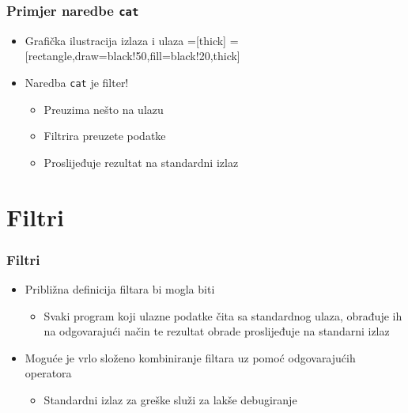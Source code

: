 \documentclass{beamer}
\newcommand{\shell}[1]{\texttt{#1}}
\begin{document}
\begin{frame}[t]
\frametitle{Primjer naredbe \shell{cat}}
\begin{itemize}
  \item Grafička ilustracija izlaza i ulaza
  \vspace{1cm}
  =[thick]
  =[rectangle,draw=black!50,fill=black!20,thick]
  \vspace{1cm}
  \item Naredba \shell{cat} je filter!
  \begin{itemize}
    \item Preuzima nešto na ulazu
    \item Filtrira preuzete podatke
    \item Proslijeđuje rezultat na standardni izlaz
  \end{itemize}
\end{itemize}
\end{frame}

\section{Filtri}
\begin{frame}[t]
\frametitle{Filtri}
\begin{itemize}
  \item Približna definicija filtara bi mogla biti
  \begin{itemize}
    \footnotesize
    \item[] Svaki program koji ulazne podatke čita sa standardnog ulaza,
            obrađuje ih na odgovarajući način te rezultat obrade
            proslijeđuje na standarni izlaz
    \normalsize
  \end{itemize}
  \item Moguće je vrlo složeno kombiniranje filtara uz pomoć odgovarajućih
        operatora
  \begin{itemize}
    \item Standardni izlaz za greške služi za lakše debugiranje
  \end{itemize}
\end{itemize}
\end{frame}
\end{document}

